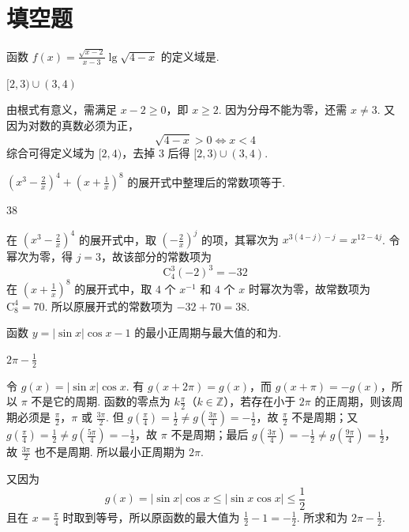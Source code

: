 \section{填空题}
\begin{problem}
函数 \( f(x) = \frac{\sqrt{x - 2}}{x - 3} \lg \sqrt{4 - x} \) 的定义域是\fillinblank{}.
\end{problem}

\begin{answer}
\( [2,3) \cup (3,4) \)
\end{answer}

\begin{solution}
由根式有意义，需满足 \(x-2\geqslant0\)，即 \(x\geqslant2\). 因为分母不能为零，还需 \(x\ne3\). 又因为对数的真数必须为正，
\[
\sqrt{4-x}>0\Longleftrightarrow x<4
\]
综合可得定义域为 \([2,4)\)，去掉 \(3\) 后得 \([2,3)\cup(3,4)\).
\end{solution}

\begin{problem}
\(\left(x^{3} - \frac{2}{x}\right)^{4} + \left(x + \frac{1}{x}\right)^{8}\) 的展开式中整理后的常数项等于\fillinblank{}.
\end{problem}

\begin{answer}
38
\end{answer}

\begin{solution}
在 \(\left(x^3-\frac2x\right)^4\) 的展开式中，取 \(\left(-\frac2x\right)^j\) 的项，其幂次为 \(x^{3(4-j)-j}=x^{12-4j}\). 令幂次为零，得 \(j=3\)，故该部分的常数项为
\[
\mathrm C_4^3(-2)^3=-32
\]
在 \(\left(x+\frac1x\right)^8\) 的展开式中，取 \(4\) 个 \(x^{-1}\) 和 \(4\) 个 \(x\) 时幂次为零，故常数项为 \(\mathrm C_8^4=70\). 所以原展开式的常数项为 \(-32+70=38\).
\end{solution}

\begin{problem}
函数 \( y = |\sin x| \cos x - 1 \) 的最小正周期与最大值的和为\fillinblank{}.
\end{problem}

\begin{answer}
\(2\pi - \frac{1}{2}\)
\end{answer}

\begin{solution}
令 \(g(x)=|\sin x|\cos x\). 有 \(g(x+2\pi)=g(x)\)，而 \(g(x+\pi)=-g(x)\)，所以 \(\pi\) 不是它的周期. 函数的零点为 \(k\frac\pi2\)（\(k\in\mathbb Z\)），若存在小于 \(2\pi\) 的正周期，则该周期必须是 \(\frac\pi2\)，\(\pi\) 或 \(\frac{3\pi}{2}\). 但 \(g\left(\frac\pi4\right)=\frac12\ne g\left(\frac{3\pi}{4}\right)=-\frac12\)，故 \(\frac\pi2\) 不是周期；又 \(g\left(\frac\pi4\right)=\frac12\ne g\left(\frac{5\pi}{4}\right)=-\frac12\)，故 \(\pi\) 不是周期；最后 \(g\left(\frac{3\pi}{4}\right)=-\frac12\ne g\left(\frac{9\pi}{4}\right)=\frac12\)，故 \(\frac{3\pi}{2}\) 也不是周期. 所以最小正周期为 \(2\pi\).

又因为
\[
g(x)=|\sin x|\cos x\leqslant|\sin x\cos x|\leqslant\frac12
\]
且在 \(x=\frac\pi4\) 时取到等号，所以原函数的最大值为 \(\frac12-1=-\frac12\). 所求和为 \(2\pi-\frac12\).
\end{solution}

